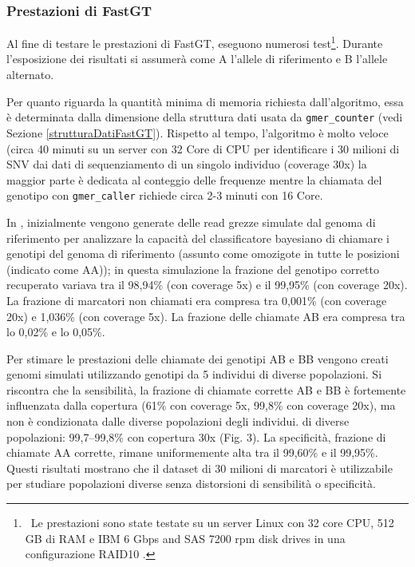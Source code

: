 \documentclass[../main.tex]{subfiles}
\begin{document}
\subsubsection{Prestazioni di FastGT}

Al fine di testare le prestazioni di FastGT, \cite{pajuste2017fastgt} eseguono numerosi test\footnote{\ Le prestazioni sono state testate su un server Linux con 32 core CPU, 512 GB di RAM e IBM 6 Gbps and SAS 7200 rpm disk drives in una configurazione RAID10 \cite{pajuste2017fastgt}.}. Durante l'esposizione dei risultati si assumerà come A l'allele di riferimento e B l'allele alternato.

Per quanto riguarda la quantità minima di memoria richiesta dall'algoritmo, essa è determinata dalla dimensione della struttura dati usata da \texttt{gmer\_counter} (vedi Sezione \ref{strutturaDatiFastGT}). Rispetto al tempo, l'algoritmo è molto veloce (circa 40 minuti su un server con 32 Core di CPU per identificare i 30 milioni di SNV dai dati di sequenziamento di un singolo individuo (coverage 30x) la maggior parte è dedicata al conteggio delle frequenze mentre la chiamata del genotipo con \texttt{gmer\_caller} richiede circa 2-3 minuti con 16 Core.

In \cite{pajuste2017fastgt}, inizialmente vengono generate delle read grezze simulate dal genoma di riferimento per analizzare la capacità del classificatore bayesiano di chiamare i genotipi del genoma di riferimento (assunto come omozigote in tutte le posizioni (indicato come AA)); in questa simulazione la frazione del genotipo corretto recuperato variava tra il 98,94\% (con coverage 5x) e il 99,95\% (con coverage 20x). La frazione di marcatori non chiamati era compresa tra 0,001\% (con coverage 20x) e 1,036\% (con coverage 5x). La frazione delle chiamate AB era compresa tra lo 0,02\% e lo 0,05\%.
 
Per stimare le prestazioni delle chiamate dei genotipi AB e BB vengono creati genomi simulati utilizzando genotipi da 5 individui di diverse popolazioni. Si riscontra che la sensibilità, la frazione di chiamate corrette AB e BB è fortemente influenzata dalla copertura (61\% con coverage 5x, 99,8\% con coverage 20x), ma non è condizionata dalle diverse popolazioni degli individui. di diverse popolazioni: 99,7–99,8\% con copertura 30x (Fig. 3). La specificità, frazione di chiamate AA corrette, rimane uniformemente alta tra il 99,60\% e il 99,95\%. Questi risultati mostrano che il dataset di 30 milioni di marcatori è utilizzabile per studiare popolazioni diverse senza distorsioni di sensibilità o specificità.
\end{document}
